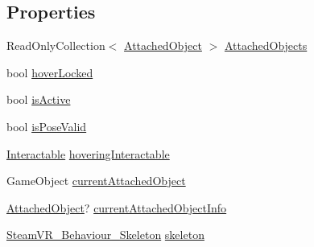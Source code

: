 \subsection*{Properties}
\begin{DoxyCompactItemize}
\item 
Read\+Only\+Collection$<$ \mbox{\hyperlink{struct_valve_1_1_v_r_1_1_interaction_system_1_1_hand_1_1_attached_object}{Attached\+Object}} $>$ \mbox{\hyperlink{class_valve_1_1_v_r_1_1_interaction_system_1_1_hand_a76f5019d199b8f37d77d9e7d03ca93ae}{Attached\+Objects}}
\item 
bool \mbox{\hyperlink{class_valve_1_1_v_r_1_1_interaction_system_1_1_hand_ae4b249fd953ffebf95b745821364166f}{hover\+Locked}}
\item 
bool \mbox{\hyperlink{class_valve_1_1_v_r_1_1_interaction_system_1_1_hand_a5171ff0d839ba09534a71011ed9a2dc2}{is\+Active}}
\item 
bool \mbox{\hyperlink{class_valve_1_1_v_r_1_1_interaction_system_1_1_hand_ab2370539dfe6446fc51463e1be0f015f}{is\+Pose\+Valid}}
\item 
\mbox{\hyperlink{class_valve_1_1_v_r_1_1_interaction_system_1_1_interactable}{Interactable}} \mbox{\hyperlink{class_valve_1_1_v_r_1_1_interaction_system_1_1_hand_a0e71fc0b3d20b5faa2b62f6b59f5dfec}{hovering\+Interactable}}
\item 
Game\+Object \mbox{\hyperlink{class_valve_1_1_v_r_1_1_interaction_system_1_1_hand_ad73d70c80ce508e57c01618f7797188e}{current\+Attached\+Object}}
\item 
\mbox{\hyperlink{struct_valve_1_1_v_r_1_1_interaction_system_1_1_hand_1_1_attached_object}{Attached\+Object}}? \mbox{\hyperlink{class_valve_1_1_v_r_1_1_interaction_system_1_1_hand_a2ba850f3dedb0fe8e2e32ac32e45e92d}{current\+Attached\+Object\+Info}}
\item 
\mbox{\hyperlink{class_valve_1_1_v_r_1_1_steam_v_r___behaviour___skeleton}{Steam\+V\+R\+\_\+\+Behaviour\+\_\+\+Skeleton}} \mbox{\hyperlink{class_valve_1_1_v_r_1_1_interaction_system_1_1_hand_ad992f20640f09e339d3d933e013e4a4c}{skeleton}}
\end{DoxyCompactItemize}



